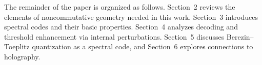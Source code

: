 \documentclass[12pt]{article}
\theoremstyle{definition} %
\theoremstyle{plain} %
\theoremstyle{remark} %
\theoremstyle{underline}
\begin{document}
The remainder of the paper is organized as follows. Section~2 reviews the elements of noncommutative geometry needed in this work. Section~3 introduces spectral codes and their basic properties. Section~4 analyzes decoding and threshold enhancement via internal perturbations. Section~5 discusses Berezin--Toeplitz quantization as a spectral code, and Section~6 explores connections to holography.









\end{document}

